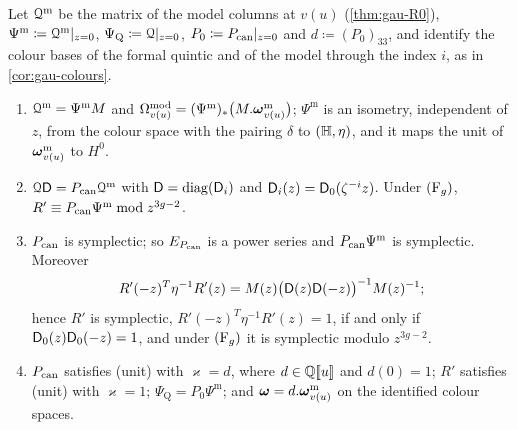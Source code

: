\begin{lem}
\label{lem:flh-inputs}
Let $\mathcal{Q}^{\mathrm m}$ be the matrix of the model columns at $v(u)$ (\cref{thm:gau-R0}), $\Psi^{\mathrm m}\coloneqq\mathcal{Q}^{\mathrm m}|_{z=0}$, $\Psi_{\mathrm Q}\coloneqq\mathcal{Q}|_{z=0}$, $P_0\coloneqq P_{\mathrm{can}}|_{z=0}$ and $d\coloneqq(P_0)_{33}$, and identify the colour bases of the formal quintic and of the model through the index $i$, as in \cref{cor:gau-colours}.
\begin{enumerate}
\item $\mathcal{Q}^{\mathrm m}=\Psi^{\mathrm m}M$ and $\Omega^{\mathrm{mod}}_{v(u)}=(\Psi^{\mathrm m})_*\bigl(M.\boldsymbol{\omega}^{\mathrm m}_{v(u)}\bigr)$; $\Psi^{\mathrm m}$ is an isometry, independent of $z$, from the colour space with the pairing $\delta$ to $(\mathbb{H},\eta)$, and it maps the unit of $\boldsymbol{\omega}^{\mathrm m}_{v(u)}$ to $H^0$.
\item $\mathcal{Q}\mathsf{D}=P_{\mathrm{can}}\mathcal{Q}^{\mathrm m}$ with $\mathsf{D}=\operatorname{diag}(\mathsf{D}_i)$ and $\mathsf{D}_i(z)=\mathsf{D}_0(\zeta^{-i}z)$. Under $(\mathrm{F}_{g})$, $R'\equiv P_{\mathrm{can}}\Psi^{\mathrm m}\bmod z^{3g-2}$.
\item $P_{\mathrm{can}}$ is symplectic; so $E_{P_{\mathrm{can}}}$ is a power series and $P_{\mathrm{can}}\Psi^{\mathrm m}$ is symplectic. Moreover
\[
R'(-z)^T\eta^{-1}R'(z)=M(z)\bigl(\mathsf{D}(z)\mathsf{D}(-z)\bigr)^{-1}M(z)^{-1};
\]
hence $R'$ is symplectic, $R'(-z)^T\eta^{-1}R'(z)=1$, if and only if $\mathsf{D}_0(z)\mathsf{D}_0(-z)=1$, and under $(\mathrm{F}_{g})$ it is symplectic modulo $z^{3g-2}$.
\item $P_{\mathrm{can}}$ satisfies (unit) with $\varkappa=d$, where $d\in\mathbb{Q}[\![ u ]\!]$ and $d(0)=1$; $R'$ satisfies (unit) with $\varkappa=1$; $\Psi_{\mathrm Q}=P_0\Psi^{\mathrm m}$; and $\boldsymbol{\omega}=d.\boldsymbol{\omega}^{\mathrm m}_{v(u)}$ on the identified colour spaces.
\end{enumerate}
\end{lem}

